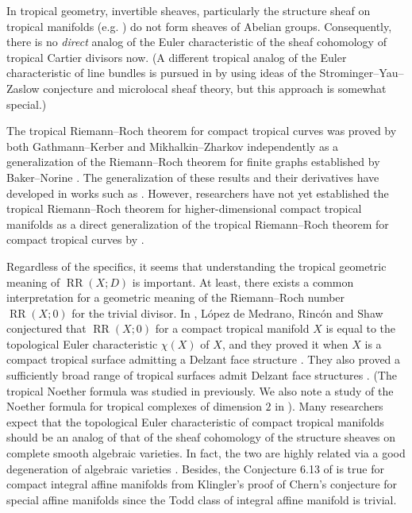 \documentclass[a4paper,dvipdfmx,reqno,12pt]{amsart}
\theoremstyle{definition}
\newcommand{\opn}[1]{\operatorname{#1}}
\numberwithin{equation}{section}
\begin{document}
In tropical geometry, invertible sheaves,
particularly the structure sheaf
on tropical manifolds
(e.g. \cite[]{MR3330789}) 
do not form sheaves of Abelian groups.
Consequently, there is no \emph{direct}
analog of the Euler characteristic of 
the sheaf cohomology of 
tropical Cartier divisors now.
(A different tropical analog of the Euler characteristic of
line bundles is pursued in \cite{tsutsui2023graded} by using ideas
of the Strominger--Yau--Zaslow conjecture and
microlocal sheaf theory, but this approach is somewhat special.)

The tropical Riemann--Roch theorem for 
compact tropical curves was proved by 
both Gathmann--Kerber \cite{MR2377750}
and Mikhalkin--Zharkov \cite{MR2457739}
independently
as a generalization of the 
Riemann--Roch theorem for finite graphs
established by Baker--Norine \cite{MR2355607}. 
The generalization of these results and
their derivatives have developed in works such as 
\cite{MR3046301,MR4251610,MR4229604,MR4444458,MR4512397}.
However, researchers have not yet established
the tropical Riemann--Roch
theorem for higher-dimensional
compact tropical manifolds
as a direct generalization of the tropical
Riemann--Roch theorem for compact tropical curves
by \cite{MR2377750,MR2457739}.

Regardless of the specifics, it seems that understanding
the tropical geometric meaning of $\opn{RR}(X;D)$ is 
important.
At least, there exists a common interpretation
for a geometric meaning of the Riemann--Roch number
$\opn{RR}(X;0)$ for the trivial divisor.
In \cite[Conjecture 6.13]{demedrano2023chern},
L\'opez de Medrano, Rinc\'on and Shaw conjectured
that $\opn{RR}(X;0)$ for a compact 
tropical manifold $X$ is equal to the 
topological Euler characteristic 
$\chi(X)$ of $X$, 
and they proved it when 
$X$ is a compact tropical surface admitting
a Delzant face structure \cite[Theorem 6.3]{demedrano2023chern}.
They also proved a sufficiently broad range of 
tropical surfaces admit Delzant face structures
\cite[Corollary 6.11]{demedrano2023chern}.
(The tropical Noether formula
was studied in \cite{shaw2015tropical} previously.
We also note a study of the Noether
formula for tropical complexes of dimension $2$
in \cite[Proposition 1.3]{cartwright2015combinatorial}).
Many researchers expect that the topological Euler 
characteristic of compact tropical manifolds
should be an analog of that of the sheaf cohomology
of the structure sheaves on complete
smooth algebraic varieties.
In fact, the two are highly related 
via a good degeneration of algebraic varieties
\cite[Corollary 2]{MR3961331}.
Besides, the Conjecture 6.13 of 
\cite{demedrano2023chern} is true for 
compact integral affine manifolds
from Klingler's proof of Chern's conjecture for
special affine manifolds \cite{MR3665000}
since the Todd class of integral affine manifold
is trivial.
\end{document}
